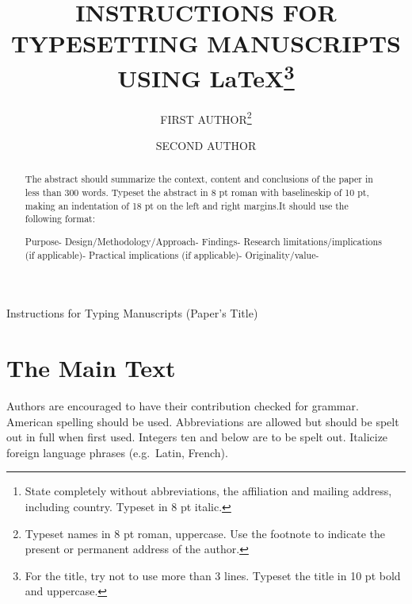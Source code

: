 \documentclass{ws-ijicc}
\begin{document}
%
\catchline{}{}{}{}{}
%

{Instructions for Typing Manuscripts (Paper's Title)}

\title{INSTRUCTIONS FOR TYPESETTING MANUSCRIPTS \\
USING \LaTeX\footnote{For the title, try not
to use more than 3 lines. Typeset the title in 10 pt bold and uppercase.}
}

\author{FIRST AUTHOR\footnote{Typeset names in 8 pt roman,
uppercase. Use the footnote to indicate the
present or permanent address of the author.}}

\address{University Department, University Name, Address\\
City, State ZIP/Zone,Country\,\footnote{State completely
without abbreviations, the affiliation and mailing address, including
country. Typeset in 8 pt italic.}\\
  }

\author{SECOND AUTHOR}

\address{Group, Laboratory, Address\\
City, State ZIP/Zone, Country\\
author\_id@domain\_name
}

\maketitle

\begin{abstract}
The abstract should summarize the context, content and conclusions
of the paper in less than 300 words. Typeset the abstract in 8 pt
roman with baselineskip of 10 pt, making an indentation of 18 pt on
the left and right margins.It should use the following format:

Purpose-
Design/Methodology/Approach-
Findings-
Research
limitations/implications (if applicable)-
Practical implications (if
applicable)-
Originality/value-
\end{abstract}



\section{The Main Text}
Authors are encouraged to have their contribution checked for grammar.
American spelling should be used. Abbreviations are allowed but should
be spelt out in full when first used. Integers ten and below are to be
spelt out. Italicize foreign language phrases (e.g.~Latin, French).
\end{document}
